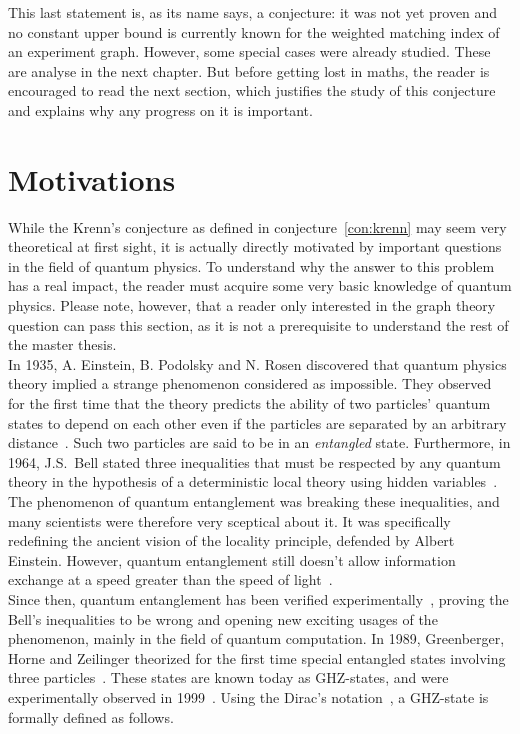 This last statement is, as its name says, a conjecture: it was not yet proven and no constant upper bound is currently known for the weighted matching index of an experiment graph.
However, some special cases were already studied.
These are analyse in the next chapter.
But before getting lost in maths, the reader is encouraged to read the next section, which justifies the study of this conjecture and explains why any progress on it is important.


\section{Motivations}
\label{sec:motivations}

While the Krenn's conjecture as defined in conjecture~\ref{con:krenn} may seem very theoretical at first sight, it is actually directly motivated by important questions in the field of quantum physics.
To understand why the answer to this problem has a real impact, the reader must acquire some very basic knowledge of quantum physics.
Please note, however, that a reader only interested in the graph theory question can pass this section, as it is not a prerequisite to understand the rest of the master thesis. \\

In 1935, A. Einstein, B. Podolsky and N. Rosen discovered that quantum physics theory implied a strange phenomenon considered as impossible.
They observed for the first time that the theory predicts the ability of two particles' quantum states to depend on each other even if the particles are separated by an arbitrary distance~\cite{EPR}.
Such two particles are said to be in an \textit{entangled} state.
Furthermore, in 1964, J.S.\ Bell stated three inequalities that must be respected by any quantum theory in the hypothesis of a deterministic local theory using hidden variables~\cite{bell1964}.
The phenomenon of quantum entanglement was breaking these inequalities, and many scientists were therefore very sceptical about it.
It was specifically redefining the ancient vision of the locality principle, defended by Albert Einstein.
However, quantum entanglement still doesn't allow information exchange at a speed greater than the speed of light~\cite{notFasterThanLight}.\\

Since then, quantum entanglement has been verified experimentally~\cite{2012QuantumTA}, proving the Bell's inequalities to be wrong and opening new exciting usages of the phenomenon, mainly in the field of quantum computation.
In 1989, Greenberger, Horne and Zeilinger theorized for the first time special entangled states involving three particles~\cite{GHZ}.
These states are known today as GHZ-states, and were experimentally observed in 1999~\cite{Bouwmeester_1999}.
Using the Dirac's notation~\cite{dirac1939}, a GHZ-state is formally defined as follows. \\

